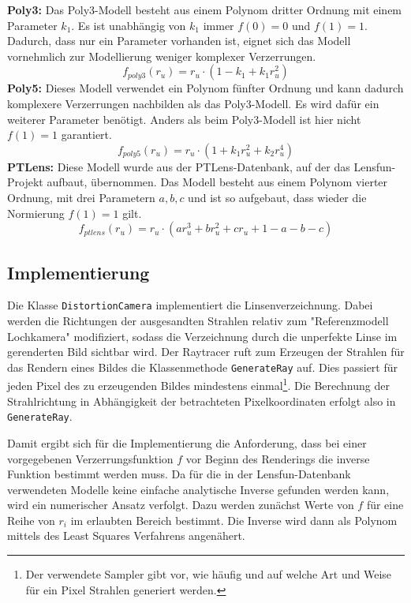 \textbf{Poly3:} Das Poly3-Modell besteht aus einem Polynom dritter Ordnung mit einem Parameter $k_1$. Es ist unabhängig von $k_1$ immer $f(0) = 0$ und $f(1) = 1$. Dadurch, dass nur ein Parameter vorhanden ist, eignet sich das Modell vornehmlich zur Modellierung weniger komplexer Verzerrungen.
\begin{equation}
	f_{poly3}(r_u) = r_u \cdot (1 - k_1 + k_1 r_u^2)
\end{equation}
\textbf{Poly5:} Dieses Modell verwendet ein Polynom fünfter Ordnung und kann dadurch komplexere Verzerrungen nachbilden als das Poly3-Modell. Es wird dafür ein weiterer Parameter benötigt. Anders als beim Poly3-Modell ist hier nicht $f(1) = 1$ garantiert.
\begin{equation}
	f_{poly5}(r_u) = r_u \cdot (1 + k_1 r_u^2 + k_2 r_u^4)
\end{equation}
\textbf{PTLens:} Diese Modell wurde aus der PTLens-Datenbank, auf der das Lensfun-Projekt aufbaut, übernommen. Das Modell besteht aus einem Polynom vierter Ordnung, mit drei Parametern $a,b,c$ und ist so aufgebaut, dass wieder die Normierung $f(1) = 1$ gilt.
\begin{equation}
	f_{ptlens}(r_u) = r_u \cdot (a r_u^3 + b r_u^2 + c r_u + 1 - a - b - c)
\end{equation}

\subsection{Implementierung}

Die Klasse \texttt{DistortionCamera} implementiert die Linsenverzeichnung. Dabei werden die Richtungen der ausgesandten Strahlen relativ zum "Referenzmodell Lochkamera" modifiziert, sodass die Verzeichnung durch die unperfekte Linse im gerenderten Bild sichtbar wird. Der Raytracer ruft zum Erzeugen der Strahlen für das Rendern eines Bildes die Klassenmethode \texttt{GenerateRay} auf. Dies passiert für jeden Pixel des zu erzeugenden Bildes mindestens einmal\footnote{Der verwendete Sampler gibt vor, wie häufig und auf welche Art und Weise für ein Pixel Strahlen generiert werden.}. Die Berechnung der Strahlrichtung in Abhängigkeit der betrachteten Pixelkoordinaten erfolgt also in \texttt{GenerateRay}.

Damit ergibt sich für die Implementierung die Anforderung, dass bei einer vorgegebenen Verzerrungsfunktion $f$ vor Beginn des Renderings die inverse Funktion bestimmt werden muss. Da für die in der Lensfun-Datenbank verwendeten Modelle keine einfache analytische Inverse gefunden werden kann, wird ein numerischer Ansatz verfolgt. Dazu werden zunächst Werte von $f$ für eine Reihe von $r_i$ im erlaubten Bereich bestimmt. Die Inverse wird dann als Polynom mittels des Least Squares Verfahrens angenähert.


